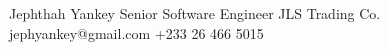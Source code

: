 %
%
%


\begin{referees}
		{Jephthah Yankey}
		{Senior Software Engineer}
		{JLS Trading Co.}
		{jephyankey@gmail.com}
		{+233 26 466 5015}
\end{referees}

